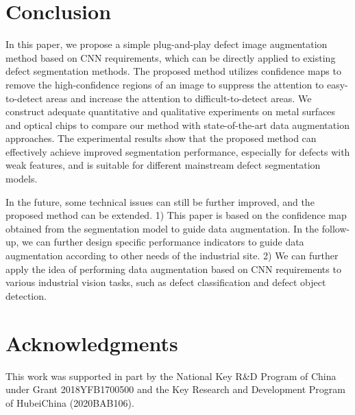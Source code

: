 \documentclass[sn-mathphys]{sn-jnl}%
\theoremstyle{thmstyleone}%
\theoremstyle{thmstyletwo}%
\theoremstyle{thmstylethree}%
\begin{document}
\section{Conclusion}\label{sec:con}
In this paper, we propose a simple plug-and-play defect image augmentation method based on CNN requirements, which can be directly applied to existing defect segmentation methods. The proposed method utilizes confidence maps to remove the high-confidence regions of an image to suppress the attention to easy-to-detect areas and increase the attention to difficult-to-detect areas. We construct adequate quantitative and qualitative experiments on metal surfaces and optical chips to compare our method with state-of-the-art data augmentation approaches. 
The experimental results show that the proposed method can effectively achieve improved segmentation performance, especially for defects with weak features, and is suitable for different mainstream defect segmentation models.

In the future, some technical issues can still be further improved, and the proposed method can be extended. 1) This paper is based on the confidence map obtained from the segmentation model to guide data augmentation. In the follow-up, we can further design specific performance indicators to guide data augmentation according to other needs of the industrial site. 2) We can further apply the idea of performing data augmentation based on CNN requirements to various industrial vision tasks, such as defect classification and defect object detection. 

\section*{Acknowledgments}

This work was supported in part by the National Key R\&D Program of China under Grant 2018YFB1700500 and the Key Research and Development Program of HubeiChina (2020BAB106).
\end{document}
